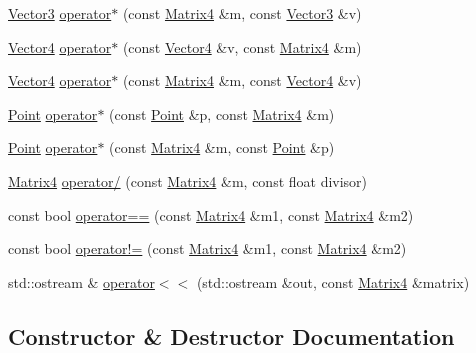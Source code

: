 \begin{DoxyCompactItemize}
\item 
\hyperlink{classprism_1_1_vector3}{Vector3} \hyperlink{classprism_1_1_matrix4_acb4d5cf5c35ead4ac8d2713d32a3bb53}{operator$\ast$} (const \hyperlink{classprism_1_1_matrix4}{Matrix4} \&m, const \hyperlink{classprism_1_1_vector3}{Vector3} \&v)
\item 
\hyperlink{classprism_1_1_vector4}{Vector4} \hyperlink{classprism_1_1_matrix4_a8f72f1280f8f44f2f85c32e930ef95f1}{operator$\ast$} (const \hyperlink{classprism_1_1_vector4}{Vector4} \&v, const \hyperlink{classprism_1_1_matrix4}{Matrix4} \&m)
\item 
\hyperlink{classprism_1_1_vector4}{Vector4} \hyperlink{classprism_1_1_matrix4_a20a9788aba6ec37d10a0c04fa479b26e}{operator$\ast$} (const \hyperlink{classprism_1_1_matrix4}{Matrix4} \&m, const \hyperlink{classprism_1_1_vector4}{Vector4} \&v)
\item 
\hyperlink{classprism_1_1_point}{Point} \hyperlink{classprism_1_1_matrix4_a00876fb2e95ed93d05c590a941d2c3a3}{operator$\ast$} (const \hyperlink{classprism_1_1_point}{Point} \&p, const \hyperlink{classprism_1_1_matrix4}{Matrix4} \&m)
\item 
\hyperlink{classprism_1_1_point}{Point} \hyperlink{classprism_1_1_matrix4_a67263983148d3a3593ebc84eae31c87a}{operator$\ast$} (const \hyperlink{classprism_1_1_matrix4}{Matrix4} \&m, const \hyperlink{classprism_1_1_point}{Point} \&p)
\item 
\hyperlink{classprism_1_1_matrix4}{Matrix4} \hyperlink{classprism_1_1_matrix4_a9370aa111e71140fdd85f3e055a26cbd}{operator/} (const \hyperlink{classprism_1_1_matrix4}{Matrix4} \&m, const float divisor)
\item 
const bool \hyperlink{classprism_1_1_matrix4_a0cbf3c575d1951cc9ae4dfe79c3a3729}{operator==} (const \hyperlink{classprism_1_1_matrix4}{Matrix4} \&m1, const \hyperlink{classprism_1_1_matrix4}{Matrix4} \&m2)
\item 
const bool \hyperlink{classprism_1_1_matrix4_aaedc2ff7fd572ebc03eec59fb11cd5a9}{operator!=} (const \hyperlink{classprism_1_1_matrix4}{Matrix4} \&m1, const \hyperlink{classprism_1_1_matrix4}{Matrix4} \&m2)
\item 
std\+::ostream \& \hyperlink{classprism_1_1_matrix4_a4ccbb04098ce491412da339e07eb72d7}{operator$<$$<$} (std\+::ostream \&out, const \hyperlink{classprism_1_1_matrix4}{Matrix4} \&matrix)
\end{DoxyCompactItemize}


\subsection{Constructor \& Destructor Documentation}
